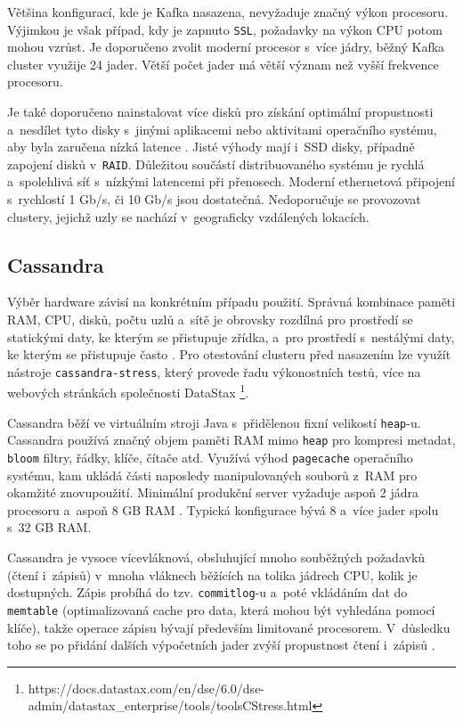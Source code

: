 Většina konfigurací, kde je Kafka nasazena, nevyžaduje značný výkon procesoru. Výjimkou je však případ, kdy je zapnuto \texttt{SSL}, požadavky na výkon CPU potom mohou vzrůst. Je doporučeno zvolit moderní procesor s~více jádry, běžný Kafka cluster využije 24 jader. Větší počet jader má větší význam než vyšší frekvence procesoru.

Je také doporučeno nainstalovat více disků pro získání optimální propustnosti a~nesdílet tyto disky s~jinými aplikacemi nebo aktivitami operačního systému, aby byla zaručena nízká latence \cite{kafkaBestPractises}. Jisté výhody mají i~SSD disky, případně zapojení disků v~\texttt{RAID}. Důležitou součástí distribuovaného systému je rychlá a~spolehlivá síť s~nízkými latencemi při přenosech. Moderní ethernetová připojení s~rychlostí 1 Gb/s, či 10 Gb/s jsou dostatečná. Nedoporučuje se provozovat clustery, jejichž uzly se nachází v~geograficky vzdálených lokacích.

\subsection{Cassandra}
Výběr hardware závisí na konkrétním případu použití. Správná kombinace paměti RAM, CPU, disků, počtu uzlů a~sítě je obrovsky rozdílná pro prostředí se statickými daty, ke kterým se přistupuje zřídka, a~pro prostředí s~nestálými daty, ke kterým se přistupuje často \cite{cassandraPlanningHW}. Pro otestování clusteru před nasazením lze využít nástroje \texttt{cassandra-stress}, který provede řadu výkonostních testů, více na webových stránkách společnosti DataStax \footnote{https://docs.datastax.com/en/dse/6.0/dse-admin/datastax\_enterprise/tools/toolsCStress.html}.

Cassandra běží ve virtuálním stroji Java s~přidělenou fixní velikostí \texttt{heap}-u. Cassandra používá značný objem paměti RAM mimo \texttt{heap} pro kompresi metadat, \texttt{bloom} filtry, řádky, klíče, čítače atd. Využívá výhod \texttt{pagecache} operačního systému, kam ukládá části naposledy manipulovaných souborů z~RAM pro okamžité znovupoužití. 
Minimální produkční server vyžaduje aspoň 2 jádra procesoru a~aspoň 8 GB RAM \cite{cassandraHW}. Typická konfigurace bývá 8 a~více jader spolu s~32 GB RAM.

Cassandra je vysoce vícevláknová, obsluhující mnoho souběžných požadavků (čtení i~zápisů) v~mnoha vláknech běžících na tolika jádrech CPU, kolik je dostupných. Zápis probíhá do tzv. \texttt{commitlog}-u a~poté vkládáním dat do \texttt{memtable} (optimalizovaná cache pro data, která mohou být vyhledána pomocí klíče), takže operace zápisu bývají především limitované procesorem. V~důsledku toho se po přidání dalších výpočetních jader zvýší propustnost čtení i~zápisů \cite{cassandraHW}.

